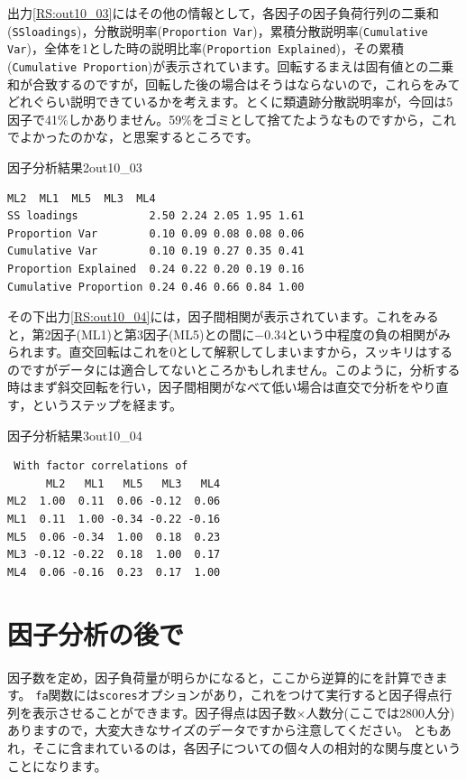 \documentclass{ltjsbook}
\begin{document}
出力\ref{RS:out10_03}にはその他の情報として，各因子の因子負荷行列の二乗和(\verb|SSloadings|)，分散説明率(\verb|Proportion Var|)，累積分散説明率(\verb|Cumulative Var|)，全体を1とした時の説明比率(\verb|Proportion Explained|)，その累積(\verb|Cumulative Proportion|)が表示されています。回転するまえは固有値との二乗和が合致するのですが，回転した後の場合はそうはならないので，これらをみてどれぐらい説明できているかを考えます。とくに類遺跡分散説明率が，今回は5因子で41\%しかありません。59\%をゴミとして捨てたようなものですから，これでよかったのかな，と思案するところです。

\begin{Rscreen}{因子分析結果2}{out10_03}
	\begin{verbatim}
ML2  ML1  ML5  ML3  ML4
SS loadings           2.50 2.24 2.05 1.95 1.61
Proportion Var        0.10 0.09 0.08 0.08 0.06
Cumulative Var        0.10 0.19 0.27 0.35 0.41
Proportion Explained  0.24 0.22 0.20 0.19 0.16
Cumulative Proportion 0.24 0.46 0.66 0.84 1.00
\end{verbatim}
\end{Rscreen}

その下出力\ref{RS:out10_04}には，因子間相関が表示されています。これをみると，第2因子(ML1)と第3因子(ML5)との間に$-0.34$という中程度の負の相関がみられます。直交回転はこれを0として解釈してしまいますから，スッキリはするのですがデータには適合してないところかもしれません。このように，分析する時はまず斜交回転を行い，因子間相関がなべて低い場合は直交で分析をやり直す，というステップを経ます。

\begin{Rscreen}{因子分析結果3}{out10_04}
	\begin{verbatim}
 With factor correlations of 
      ML2   ML1   ML5   ML3   ML4
ML2  1.00  0.11  0.06 -0.12  0.06
ML1  0.11  1.00 -0.34 -0.22 -0.16
ML5  0.06 -0.34  1.00  0.18  0.23
ML3 -0.12 -0.22  0.18  1.00  0.17
ML4  0.06 -0.16  0.23  0.17  1.00
\end{verbatim}
\end{Rscreen}

\section{因子分析の後で}

因子数を定め，因子負荷量が明らかになると，ここから逆算的にを計算できます。
\texttt{fa}関数には\texttt{scores}オプションがあり，これをつけて実行すると因子得点行列を表示させることができます。因子得点は因子数$\times$人数分(ここでは2800人分)ありますので，大変大きなサイズのデータですから注意してください。
ともあれ，そこに含まれているのは，各因子についての個々人の相対的な関与度ということになります。
\end{document}
